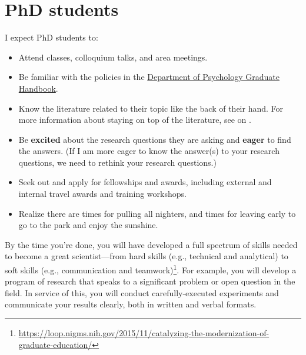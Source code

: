 \documentclass[letterpaper,12pt,oneside]{memoir}
\begin{document}




\section{PhD students}

I expect PhD students to:

\begin{itemize}
\item Attend classes, colloquium talks, and area meetings.
\item Be familiar with the policies in the \href{https://docs.google.com/document/d/1hoxVN1ol7ZGB10_9N0k8yVxkRDJLcMVYGTp-Nwgbm94/edit}{Department of Psychology Graduate Handbook}.
\item Know the literature related to their topic like the back of their hand. For more information about staying on top of the literature, see  on .
\item Be \textbf{excited} about the research questions they are asking and \textbf{eager} to find the answers. (If I am more eager to know the answer(s) to your research questions, we need to rethink your research questions.)
\item Seek out and apply for fellowships and awards, including external and internal travel awards and training workshops.
\item Realize there are times for pulling all nighters, and times for leaving early to go to the park and enjoy the sunshine.
\end{itemize}

By the time you're done, you will have developed a full spectrum of skills needed to become a great scientist---from hard skills (e.g., technical and analytical) to soft skills (e.g., communication and teamwork)\footnote{\url{https://loop.nigms.nih.gov/2015/11/catalyzing-the-modernization-of-graduate-education/}}. For example, you will develop a program of research that speaks to a significant problem or open question in the field. In service of this, you will conduct carefully-executed experiments and communicate your results clearly, both in written and verbal formats. 
\end{document}
